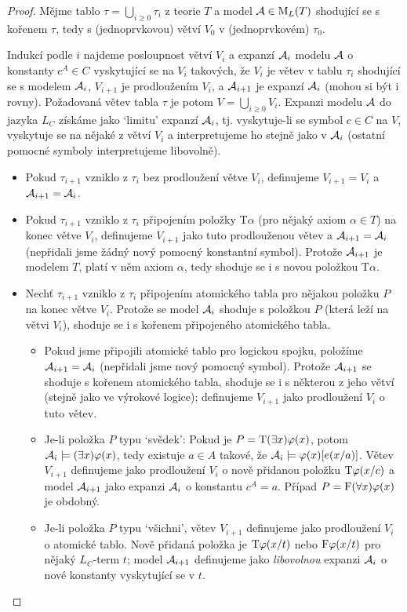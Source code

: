 \begin{proof}
    Mějme tablo $\tau=\bigcup_{i\geq 0}\tau_i$ z teorie $T$ a model $\mathcal{A}\in\operatorname{M}_L(T)$ shodující se s kořenem $\tau$, tedy s (jednoprvkovou) větví $V_0$ v (jednoprvkovém) $\tau_0$.
    
    Indukcí podle $i$ najdeme posloupnost větví $V_i$ a expanzí $\mathcal{A}_i$ modelu $\mathcal{A}$ o konstanty $c^A\in C$ vyskytující se na $V_i$ takových, že $V_i$ je větev v tablu $\tau_i$ shodující se s modelem $\mathcal{A}_i$, $V_{i+1}$ je prodloužením $V_i$, a $\mathcal{A}_{i+1}$ je expanzí $\mathcal{A}_i$ (mohou si být i rovny). Požadovaná větev tabla $\tau$ je potom $V=\bigcup_{i\geq 0}V_i$. Expanzi modelu $\mathcal{A}$ do jazyka $L_C$ získáme jako `limitu' expanzí $\mathcal{A}_i$, tj. vyskytuje-li se symbol $c\in C$ na $V$, vyskytuje se na nějaké z větví $V_i$ a interpretujeme ho stejně jako v $\mathcal{A}_i$ (ostatní pomocné symboly interpretujeme libovolně).
    \begin{itemize}
        \item Pokud $\tau_{i+1}$ vzniklo z $\tau_i$ bez prodloužení větve $V_i$, definujeme $V_{i+1}=V_i$ a $\mathcal{A}_{i+1}=\mathcal{A}_{i}$.
        \item Pokud $\tau_{i+1}$ vzniklo z $\tau_i$ připojením položky $\mathrm{T}\alpha$ (pro nějaký axiom $\alpha\in T$) na konec větve  $V_i$, definujeme $V_{i+1}$ jako tuto prodlouženou větev a $\mathcal{A}_{i+1}=\mathcal{A}_i$ (nepřidali jsme žádný nový pomocný konstantní symbol). Protože $\mathcal{A}_{i+1}$ je modelem $T$, platí v něm axiom $\alpha$, tedy shoduje se i s novou položkou $\mathrm{T}\alpha$.
        \item Nechť $\tau_{i+1}$ vzniklo z $\tau_i$ připojením atomického tabla pro nějakou položku $P$ na konec větve $V_i$. Protože se model $\mathcal{A}_i$ shoduje s položkou $P$ (která leží na větvi $V_i$), shoduje se i s kořenem připojeného atomického tabla.
        \begin{itemize}
            \item Pokud jsme připojili atomické tablo pro logickou spojku, položíme $\mathcal{A}_{i+1}=\mathcal{A}_i$ (nepřidali jsme nový pomocný symbol). Protože $\mathcal{A}_{i+1}$ se shoduje s kořenem atomického tabla, shoduje se i s některou z jeho větví (stejně jako ve výrokové logice); definujeme $V_{i+1}$ jako prodloužení $V_i$ o tuto větev.
            \item Je-li položka $P$ typu `svědek': Pokud je $P=\mathrm{T}(\exists x)\varphi(x)$, potom $\mathcal{A}_i\models(\exists x)\varphi(x)$, tedy existuje $a\in A$ takové, že $\mathcal{A}_i\models\varphi(x)[e(x/a)]$. Větev $V_{i+1}$ definujeme jako prodloužení $V_i$ o nově přidanou položku $\mathrm{T}\varphi(x/c)$ a model $\mathcal{A}_{i+1}$ jako expanzi $\mathcal{A}_i$ o konstantu $c^A=a$. Případ $P=\mathrm{F}(\forall x)\varphi(x)$ je obdobný.
            \item Je-li položka $P$ typu `všichni', větev $V_{i+1}$ definujeme jako prodloužení $V_i$ o atomické tablo. Nově přidaná položka je $\mathrm{T}\varphi(x/t)$ nebo $\mathrm{F}\varphi(x/t)$ pro nějaký $L_C$-term $t$; model $\mathcal{A}_{i+1}$ definujeme jako \emph{libovolnou} expanzi $\mathcal{A}_i$ o nové konstanty vyskytující se v $t$.
        \end{itemize}       
        \todo
  
    \end{itemize}
\end{proof}


